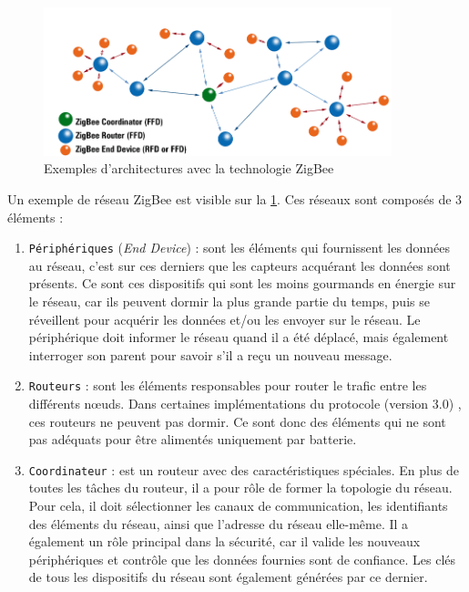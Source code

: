 \begin{figure}[ht!]
\centering
\includegraphics[width=0.9\textwidth]{Figures/StateOfTheArt/zig_bee_architecture.jpg}
\caption{Exemples d'architectures avec la technologie ZigBee}
\label{fig-zig_bee_architecture}
\end{figure}

Un exemple de réseau ZigBee est visible sur la \cref{fig-zig_bee_architecture}. Ces réseaux sont composés de 3 éléments : 
\begin{enumerate}
    \item \texttt{Périphériques} (\textit{End Device}) : sont les éléments qui fournissent les données au réseau, c'est sur ces derniers que les capteurs acquérant les données sont présents. Ce sont ces dispositifs qui sont les moins gourmands en énergie sur le réseau, car ils peuvent dormir la plus grande partie du temps, puis se réveillent pour acquérir les données et/ou les envoyer sur le réseau. Le périphérique doit informer le réseau quand il a été déplacé, mais également interroger son parent pour savoir s'il a reçu un nouveau message.
    \item \texttt{Routeurs} : sont les éléments responsables pour router le trafic entre les différents n\oe uds. Dans certaines implémentations du protocole (version 3.0) \cite{httpswww49:online}, ces routeurs ne peuvent pas dormir. Ce sont donc des éléments qui ne sont pas adéquats pour être alimentés uniquement par batterie.
    \item \texttt{Coordinateur} : est un routeur avec des caractéristiques spéciales\cite{httpswww49:online}. En plus de toutes les tâches du routeur, il a pour rôle de former la topologie du réseau. Pour cela, il doit sélectionner les canaux de communication, les identifiants des éléments du réseau, ainsi que l'adresse du réseau elle-même. Il a également un rôle principal dans la sécurité, car il valide les nouveaux périphériques et contrôle que les données fournies sont de confiance. Les clés de tous les dispositifs du réseau sont également générées par ce dernier.
\end{enumerate}



